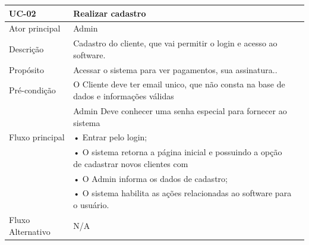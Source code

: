 \documentclass[a4paper,12pt]{article}
\begin{document}
\begin{table}[ht]
    \centering
    \begin{tabular}{|p{3.5cm}|p{10cm}|p{7cm}|}
        \hline
        \textbf{UC-02}                     & \textbf{Realizar cadastro}                                                               \\
        \hline

        \multirow{1}{*}{Ator principal}    & Admin                                                                                    \\
        \hline
        \multirow{1}{*}{Descrição}         & Cadastro do cliente, que vai permitir o login e acesso ao software.                      \\
        \hline

        \multirow{1}{*}{Propósito}         & Acessar o sistema para ver pagamentos, sua assinatura..                                  \\
        \hline

        \multirow{1}{*}{Pré-condição}      & O Cliente deve ter email unico, que não consta na base de dados e informações válidas    \\
                                           & Admin Deve conhecer uma senha especial para fornecer ao sistema                          \\
        \hline

        \multirow{1}{*}{Fluxo principal}
                                           & • Entrar pelo login;                                                                     \\
                                           & • O sistema retorna a página inicial e possuindo a opção de cadastrar novos clientes com \\
                                           & • O Admin informa os dados de cadastro;                                                  \\
                                           & • O sistema habilita as ações relacionadas ao software para o usuário.                   \\
        \cline{2-2}
        \hline

        \multirow{1}{*}{Fluxo Alternativo} & N/A                                                                                      \\
        \hline


\end{tabular}
\end{table}
\end{document}
